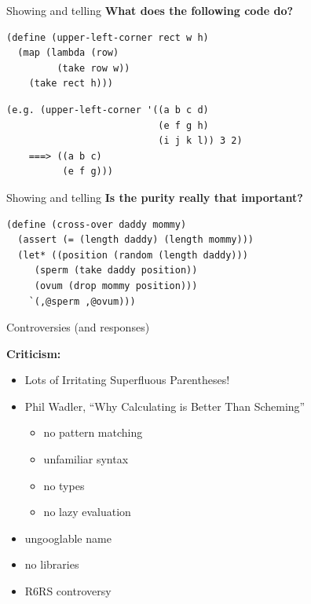 \documentclass{beamer}
\begin{document}
\begin{frame}[fragile]{Showing and telling}
  \textbf{What does the following code do?}
  \pause
  \begin{Verbatim}
(define (upper-left-corner rect w h)
  (map (lambda (row)
         (take row w))
    (take rect h)))
  \end{Verbatim}
  \pause
  \begin{Verbatim}
(e.g. (upper-left-corner '((a b c d)
                           (e f g h)
                           (i j k l)) 3 2)
    ===> ((a b c)
          (e f g)))
  \end{Verbatim}
\end{frame}

\begin{frame}[fragile]{Showing and telling}
  \textbf{Is the purity really that important?}
  \begin{Verbatim}
(define (cross-over daddy mommy)
  (assert (= (length daddy) (length mommy)))
  (let* ((position (random (length daddy)))
	 (sperm (take daddy position))
	 (ovum (drop mommy position)))
    `(,@sperm ,@ovum)))
  \end{Verbatim}
\end{frame}


\begin{frame}{Controversies (and responses)}

  \textbf{Criticism:}
  \begin{itemize}
    \pause
  \item Lots of Irritating Superfluous Parentheses!
    \pause
  \item Phil Wadler, ``Why Calculating is Better Than Scheming''
    \begin{itemize}
      \pause
    \item no pattern matching
      \pause
    \item unfamiliar syntax
      \pause
    \item no types
      \pause
    \item no lazy evaluation
    \end{itemize}
    \pause
  \item ungooglable name
    \pause
  \item no libraries
    \pause
  \item R6RS controversy
  \end{itemize}
    
\end{frame}
\end{document}
